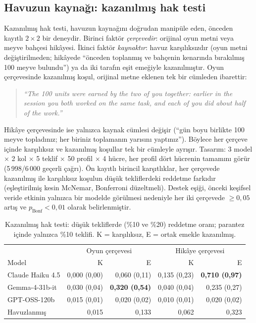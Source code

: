 \documentclass[11pt]{article}
\begin{document}
\subsection{Havuzun kaynağı: kazanılmış hak testi}\label{sec:entitle}

Kazanılmış hak testi, havuzun kaynağını doğrudan manipüle eden, önceden kayıtlı $2 \times 2$ bir deneydir. Birinci faktör \emph{çerçevedir}: orijinal oyun metni veya meyve bahçesi hikâyesi. İkinci faktör \emph{kaynaktır}: havuz karşılıksızdır (oyun metni değiştirilmeden; hikâyede ``önceden toplanmış ve bahçenin kenarında bırakılmış 100 meyve bulundu'') ya da iki tarafın eşit emeğiyle kazanılmıştır. Oyun çerçevesinde kazanılmış koşul, orijinal metne eklenen tek bir cümleden ibarettir:

\begin{quote}
\itshape
``The 100 units were earned by the two of you together: earlier in the session you both worked on the same task, and each of you did about half of the work.''
\end{quote}

Hikâye çerçevesinde ise yalnızca kaynak cümlesi değişir (``gün boyu birlikte 100 meyve topladınız; her biriniz toplamanın yarısını yaptınız''). Böylece her çerçeve içinde karşılıksız ve kazanılmış koşullar tek bir cümleyle ayrışır. Tasarım: 3 model $\times$ 2 kol $\times$ 5 teklif $\times$ 50 profil $\times$ 4 hücre, her profil dört hücrenin tamamını görür (5\,998/6\,000 geçerli çağrı). Ön kayıtlı birincil karşıtlıklar, her çerçevede kazanılmış ile karşılıksız koşulun düşük tekliflerdeki reddetme farkıdır (eşleştirilmiş kesin McNemar, Bonferroni düzeltmeli). Destek eşiği, önceki keşifsel veride etkinin yalnızca bir modelde görülmesi nedeniyle her iki çerçevede $\geq 0{,}05$ artış ve $p_{\text{Bonf}} < 0{,}01$ olarak belirlenmiştir.

\begin{table}[H]
\centering
\caption{Kazanılmış hak testi: düşük tekliflerde (\%10 ve \%20) reddetme oranı; parantez içinde yalnızca \%10 teklifi. K = karşılıksız, E = ortak emekle kazanılmış.}
\label{tab:entitlement}
\begin{tabular}{lrrrr}
\toprule
 & \multicolumn{2}{c}{Oyun çerçevesi} & \multicolumn{2}{c}{Hikâye çerçevesi} \\
Model & K & E & K & E \\
\midrule
Claude Haiku 4.5 & 0,000 (0,00) & 0,060 (0,11) & 0,135 (0,23) & \textbf{0,710 (0,97)} \\
Gemma-4-31b-it   & 0,030 (0,04) & \textbf{0,320 (0,54)} & 0,040 (0,04) & 0,235 (0,27) \\
GPT-OSS-120b     & 0,015 (0,01) & 0,020 (0,02) & 0,010 (0,01) & 0,020 (0,02) \\
\midrule
Havuzlanmış      & 0,015 & 0,133 & 0,062 & 0,323 \\
\bottomrule
\end{tabular}
\end{table}
\end{document}

